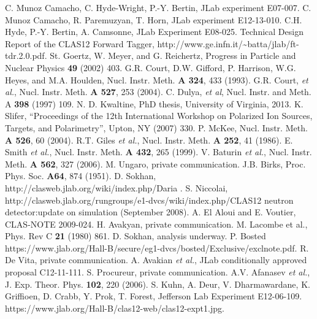 \documentclass[12pt, letterpaper]{article}
\begin{document}
\begin{thebibliography}{999}
 C. Munoz Camacho, C. Hyde-Wright, P.-Y. Bertin, JLab experiment E07-007.
 C. Munoz Camacho, R. Paremuzyan, T. Horn, JLab experiment E12-13-010. 
 C.H. Hyde, P.-Y. Bertin, A. Camsonne, JLab Experiment E08-025.
 Technical Design Report of the CLAS12 Forward Tagger, {\rm http://www.ge.infn.it/\textasciitilde batta/jlab/ft-tdr.2.0.pdf}.
 St. Goertz, W. Meyer, and G. Reichertz, Progress in Particle and Nuclear Physics {\bf 49} (2002) 403.
 G.R. Court, D.W. Gifford, P. Harrison, W.G. Heyes, and M.A. Houlden, Nucl. Instr. Meth. {\bf A 324}, 433 (1993). 
 G.R. Court, {\it et al.}, Nucl. Instr. Meth. {\bf A 527}, 253 (2004).
  C. Dulya, {\it et al}, Nucl. Instr. and Meth. A \textbf{398} (1997) 109.
 N. D. Kwaltine, PhD thesis, University of Virginia, 2013.
 K. Slifer, ``Proceedings of the 12th International Workshop on Polarized Ion Sources, Targets, and Polarimetry'', Upton, NY (2007) 330.
 P. McKee, Nucl. Instr. Meth. {\bf A 526}, 60 (2004).
 R.T. Giles {\it et al.}, Nucl. Instr. Meth. {\bf A 252}, 41 (1986).
 E. Smith {\it et al.}, Nucl. Instr. Meth. {\bf A 432}, 265 (1999).
 V. Baturin {\it et al.}, Nucl. Instr. Meth. {\bf A 562}, 327 (2006).
 M. Ungaro, private communication.
 J.B. Birks, Proc. Phys. Soc. {\bf A64}, 874 (1951).
 D. Sokhan, http://clasweb.jlab.org/wiki/index.php/Daria .
 S. Niccolai, {\rm http://clasweb.jlab.org/rungroups/e1-dvcs/wiki/index.php/CLAS12 neutron detector:update on simulation (September 2008)}.
 A. El Aloui and E. Voutier, CLAS-NOTE 2009-024.
 H. Avakyan, private communication.
 M. Lacombe et al., Phys. Rev C {\bf 21} (1980) 861.
 D. Sokhan, analysis underway. 
 P. Bosted {\rm https://www.jlab.org/Hall-B/secure/eg1-dvcs/bosted/Exclusive/exclnote.pdf}.
  R. De Vita, private communication.
 A. Avakian {\it et al.}, JLab conditionally approved proposal C12-11-111. 
 S. Procureur, private communication.  
 A.V. Afanasev {\it et al.}, J. Exp. Theor. Phys. {\bf 102}, 220 (2006).
 S. Kuhn, A. Deur, V. Dharmawardane, K. Griffioen, D. Crabb, Y. Prok, T. Forest, Jefferson Lab Experiment E12-06-109.
 {\rm https://www.jlab.org/Hall-B/clas12-web/clas12-expt1.jpg}.

\end{thebibliography}
\end{document}
